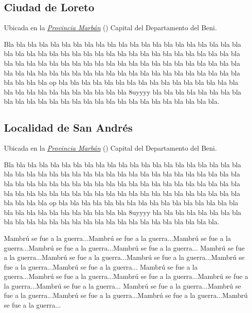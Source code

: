 \documentclass[letterpaper,10pt,english]{sphinxmanual}
\begin{document}
\subsection{Ciudad de Loreto}
\label{marban:loreto}\label{marban:ciudad-de-loreto}
Ubicada en la {\hyperref[marban:marban]{\emph{Provincia Marbán}}} () Capital del Departamento del Beni.

Bla bla bla bla bla bla bla bla bla bla bla bla bla bla bla bla bla bla bla bla bla bla bla bla bla bla bla bla bla bla bla bla bla bla
bla bla bla bla bla bla bla bla bla bla bla bla bla bla bla bla bla bla bla bla bla bla bla bla bla bla bla
bla bla bla bla bla bla bla bla bla bla bla bla bla bla bla bla bla bla bla bla bla bla bla bla bla bla bla op
bla bla bla bla bla bla bla bla bla bla bla bla bla bla bla bla bla bla bla bla bla bla bla bla bla bla bla 8uyyyy
bla bla bla bla bla bla bla bla bla bla bla bla bla bla bla bla bla bla bla bla bla bla bla bla bla bla bla.


\subsection{Localidad de San Andrés}
\label{marban:san-andres}\label{marban:localidad-de-san-andres}
Ubicada en la {\hyperref[marban:marban]{\emph{Provincia Marbán}}} () Capital del Departamento del Beni.

Bla bla bla bla bla bla bla bla bla bla bla bla bla bla bla bla bla bla bla bla bla bla bla bla bla bla bla bla bla bla bla bla bla bla
bla bla bla bla bla bla bla bla bla bla bla bla bla bla bla bla bla bla bla bla bla bla bla bla bla bla bla
bla bla bla bla bla bla bla bla bla bla bla bla bla bla bla bla bla bla bla bla bla bla bla bla bla bla bla op
bla bla bla bla bla bla bla bla bla bla bla bla bla bla bla bla bla bla bla bla bla bla bla bla bla bla bla 8uyyyy
bla bla bla bla bla bla bla bla bla bla bla bla bla bla bla bla bla bla bla bla bla bla bla bla bla bla bla.
\begin{quote}


\end{quote}

Mambrú se fue a la guerra...Mambrú se fue a la guerra...Mambrú se fue a la guerra...Mambrú se fue a la guerra...Mambrú se fue a la guerra...
Mambrú se fue a la guerra...Mambrú se fue a la guerra...Mambrú se fue a la guerra...Mambrú se fue a la guerra...Mambrú se fue a la guerra...
Mambrú se fue a la guerra...Mambrú se fue a la guerra...Mambrú se fue a la guerra...Mambrú se fue a la guerra...Mambrú se fue a la guerra...
Mambrú se fue a la guerra...Mambrú se fue a la guerra...Mambrú se fue a la guerra...Mambrú se fue a la guerra...Mambrú se fue a la guerra...
\begin{quote}


\end{quote}
\end{document}
